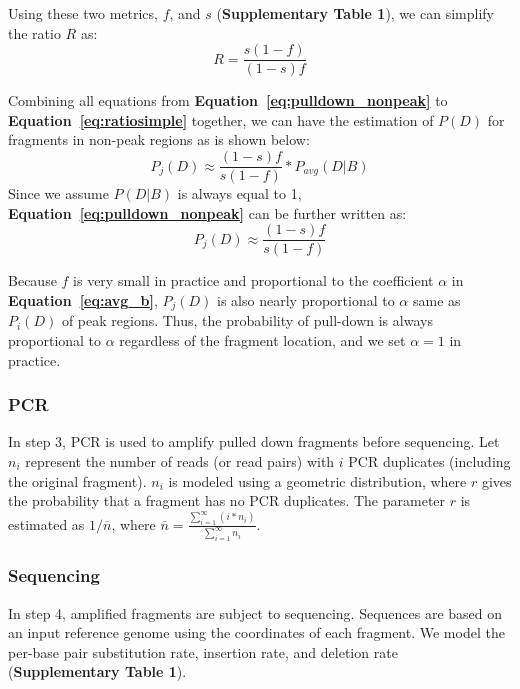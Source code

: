 \documentclass[12pt]{article}
\begin{document}
Using these two metrics, $f$, and $s$ (\textbf{Supplementary Table 1}), we can simplify the ratio $R$ as:
\begin{equation} \label{eq:ratiosimple}
  R = \frac{s(1-f)}{(1-s)f}
\end{equation}

Combining all equations from \textbf{Equation~\ref{eq:pulldown_nonpeak}} to \textbf{Equation~\ref{eq:ratiosimple}} together, we can have the estimation of $P(D)$ for fragments in non-peak regions as is shown below:
\begin{equation} \label{eq:pulldown_nonpeak_in_practice_1}
P_j(D) \approx \frac{(1-s)f}{s(1-f)} * P_{avg}(D|B)
\end{equation}
Since we assume $P(D|B)$ is always equal to 1, \textbf{Equation~\ref{eq:pulldown_nonpeak}} can be further written as:
\begin{equation} \label{eq:pulldown_nonpeak_in_practice_2}
P_j(D) \approx \frac{(1-s)f}{s(1-f)}
\end{equation}

Because $f$ is very small in practice and proportional to the coefficient $\alpha$ in \textbf{Equation~\ref{eq:avg_b}}, $P_j(D)$ is also nearly proportional to $\alpha$ same as $P_i(D)$ of peak regions. Thus, the probability of pull-down is always proportional to $\alpha$ regardless of the fragment location, and we set $\alpha = 1$ in practice.

\subsubsection*{PCR}

In step 3, PCR is used to amplify pulled down fragments before sequencing.
Let $n_i$ represent the number of reads (or read pairs) with $i$ PCR duplicates (including the original fragment).
$n_i$ is modeled using a geometric distribution, where $r$ gives the probability that a fragment has no PCR duplicates.
The parameter $r$ is estimated as $1/\overline{n}$, where $\overline{n} = \frac{\sum_{i=1}^\infty (i * n_i)}{\sum_{i=1}^\infty n_i}$.

\subsubsection*{Sequencing}

In step 4, amplified fragments are subject to sequencing.
Sequences are based on an input reference genome using the coordinates of each fragment.
We model the per-base pair substitution rate, insertion rate, and deletion rate (\textbf{Supplementary Table 1}).
\end{document}
